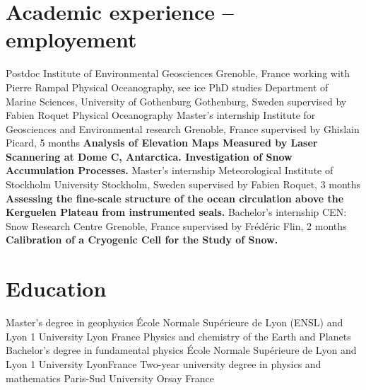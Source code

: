 \documentclass[11pt,a4paper,roman]{moderncv}
\begin{document}
\makecvtitle


\section{Academic experience -- employement}
        {Postdoc}
        {Institute of Environmental Geosciences}
        {Grenoble, France}
        {working with Pierre Rampal}
        {Physical Oceanography, see ice}
        {PhD studies}
        {Department of Marine Sciences, University of Gothenburg}
        {Gothenburg, Sweden}
        {supervised by Fabien Roquet}
        {Physical Oceanography}
        {Master's internship}
        {Institute for Geosciences and Environmental research}
        {Grenoble, France}
        {supervised by Ghislain Picard, 5 months}
        {\textbf{Analysis of Elevation Maps Measured by Laser Scannering at
            Dome C, Antarctica. Investigation of Snow Accumulation Processes.}}
        {Master's internship}
        {Meteorological Institute of Stockholm University}
        {Stockholm, Sweden}
        {supervised by Fabien Roquet, 3 months}
        {\textbf{Assessing the fine-scale structure of the ocean
            circulation above the Kerguelen Plateau from instrumented seals.}}
        {Bachelor's internship}
        {CEN: Snow Research Centre}
        {Grenoble, France}
        {supervised by Frédéric Flin, 2 months}
        {\textbf{Calibration of a Cryogenic Cell for the Study of Snow.}}



\section{Education}
        {Master's degree in geophysics}
        {École Normale Supérieure de Lyon (ENSL) and Lyon 1 University}
        {Lyon}
        {France}
        {Physics and chemistry of the Earth and Planets}
        {Bachelor's degree in fundamental physics}
        {École Normale Supérieure de Lyon and Lyon 1 University}
        {Lyon}{France}{}
        {Two-year university degree in physics and mathematics}
        {Paris-Sud University}
        {Orsay}
        {France}
        {}


        
\end{document}
